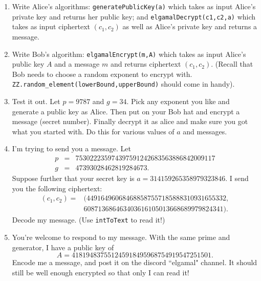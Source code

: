 \documentclass[11pt]{article}
\begin{document}
\begin{enumerate}
{  \begin{enumerate}
    \item{
    Write Alice's algorithms: \verb|generatePublicKey(a)| which takes as input Alice's private key and returns her public key; and \verb|elgamalDecrypt(c1,c2,a)| which takes as input ciphertext $(c_1,c_2)$ as well as Alice's private key and returns a message.
    }
    \item{
    Write Bob's algorithm: \verb|elgamalEncrypt(m,A)| which takes as input Alice's public key $A$ and a message $m$ and returns ciphertext $(c_1,c_2)$.  (Recall that Bob needs to choose a random exponent to encrypt with.  \verb|ZZ.random_element(lowerBound,upperBound)| should come in handy).
    }
    \item{
    Test it out.  Let $p=9787$ and $g=34$.  Pick any exponent you like and generate a public key as Alice.  Then put on your Bob hat and encrypt a message (secret number).  Finally decrypt it as alice and make sure you got what you started with.  Do this for various values of $a$ and messages.
    }
    \item{
    I'm trying to send you a message.  Let
    \begin{eqnarray*}
      p&=&753022235974397591242683563886842009117\\
      g&=&47393028462819284673.
    \end{eqnarray*}
    Suppose further that your secret key is $a=314159265358979323846$.  I send you the following ciphertext:
    \begin{eqnarray*}(c_1,c_2) =& (449164960684688587557185888310931655332,\\
      &608713686463403616105013668689979824341).
    \end{eqnarray*}
    Decode my message. (Use \verb|intToText| to read it!)
    }
    \item{
    You're welcome to respond to my message.  With the same prime and generator, I have a public key of
    \[A = 418194837551245918495968754919547251501.\]
    Encode me a message, and post it on the discord ``elgamal" channel.  It should still be well enough encrypted so that only I can read it!
    }
  \end{enumerate}
  }
\end{enumerate}
\newpage
\end{document}
